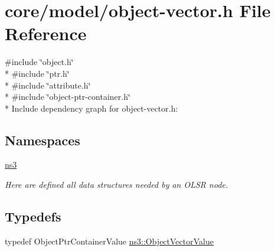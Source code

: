 \hypertarget{object-vector_8h}{}\section{core/model/object-\/vector.h File Reference}
\label{object-vector_8h}
{\ttfamily \#include \char`\"{}object.\+h\char`\"{}}\\*
{\ttfamily \#include \char`\"{}ptr.\+h\char`\"{}}\\*
{\ttfamily \#include \char`\"{}attribute.\+h\char`\"{}}\\*
{\ttfamily \#include \char`\"{}object-\/ptr-\/container.\+h\char`\"{}}\\*
Include dependency graph for object-\/vector.h\+:
\subsection*{Namespaces}
\begin{DoxyCompactItemize}
\item 
 \hyperlink{namespacens3}{ns3}
\begin{DoxyCompactList}\small\item\em Here are defined all data structures needed by an O\+L\+SR node. \end{DoxyCompactList}\end{DoxyCompactItemize}
\subsection*{Typedefs}
\begin{DoxyCompactItemize}
\item 
typedef Object\+Ptr\+Container\+Value \hyperlink{namespacens3_a5de726d8bcea7a51fd68ce5167a66713}{ns3\+::\+Object\+Vector\+Value}
\end{DoxyCompactItemize}
